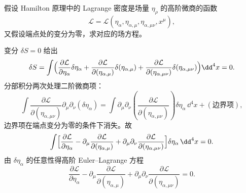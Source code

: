 \begin{question}
假设 Hamilton 原理中的 Lagrange 密度是场量 \(\eta_\rho\) 的高阶微商的函数
\[
\mathcal L = \mathcal L(\eta_\alpha,\eta_{\alpha,\mu},\eta_{\alpha,\mu\nu},x^\mu),
\]
又假设端点处的变分为零，求对应的场方程。
\begin{solution}
变分 \(\delta S=0\) 给出
\[
\delta S = \int\Bigl(
\frac{\partial\mathcal L}{\partial\eta_\alpha}\delta\eta_\alpha
+\frac{\partial\mathcal L}{\partial(\eta_{\alpha,\mu})}\delta(\eta_{\alpha,\mu})
+\frac{\partial\mathcal L}{\partial(\eta_{\alpha,\mu\nu})}\delta(\eta_{\alpha,\mu\nu})
\Bigr)\dd^4x = 0 .
\]
分部积分两次处理二阶微商项：
\[
\int\frac{\partial\mathcal L}{\partial(\eta_{\alpha,\mu\nu})}\partial_\mu\partial_\nu(\delta\eta_\alpha)
= \int\partial_\mu\partial_\nu\!\left(\frac{\partial\mathcal L}{\partial(\eta_{\alpha,\mu\nu})}\right)
\delta\eta_\alpha\,\dd^4x
+(\text{边界项}),
\]
边界项在端点变分为零的条件下消失。故
\[
\int\Bigl[
\frac{\partial\mathcal L}{\partial\eta_\alpha}
-\partial_\mu\frac{\partial\mathcal L}{\partial(\eta_{\alpha,\mu})}
+\partial_\mu\partial_\nu\frac{\partial\mathcal L}{\partial(\eta_{\alpha,\mu\nu})}
\Bigr]\delta\eta_\alpha\,\dd^4x = 0 .
\]
由 \(\delta\eta_\alpha\) 的任意性得高阶 Euler--Lagrange 方程
\[
\frac{\partial\mathcal L}{\partial\eta_\alpha}
-\partial_\mu\frac{\partial\mathcal L}{\partial(\eta_{\alpha,\mu})}
+\partial_\mu\partial_\nu\frac{\partial\mathcal L}{\partial(\eta_{\alpha,\mu\nu})}=0 .
\]
\end{solution}
\end{question}

